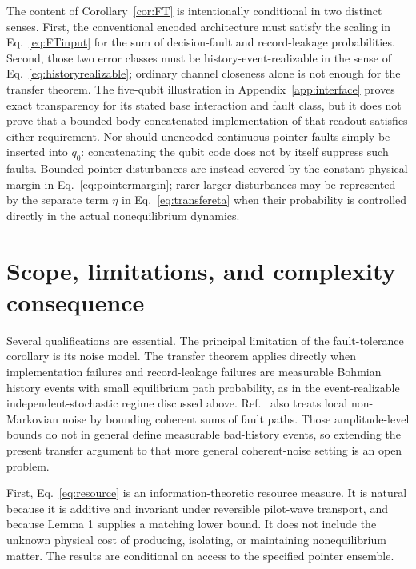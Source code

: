 \documentclass[pdflatex,sn-mathphys-num]{sn-jnl}
\theoremstyle{thmstyleone}
\begin{document}
The content of Corollary~\ref{cor:FT} is intentionally conditional in two distinct senses. First, the conventional encoded architecture must satisfy the scaling in Eq.~\eqref{eq:FTinput} for the sum of decision-fault and record-leakage probabilities. Second, those two error classes must be history-event-realizable in the sense of Eq.~\eqref{eq:historyrealizable}; ordinary channel closeness alone is not enough for the transfer theorem. The five-qubit illustration in Appendix~\ref{app:interface} proves exact transparency for its stated base interaction and fault class, but it does not prove that a bounded-body concatenated implementation of that readout satisfies either requirement. Nor should unencoded continuous-pointer faults simply be inserted into $q_0$: concatenating the qubit code does not by itself suppress such faults. Bounded pointer disturbances are instead covered by the constant physical margin in Eq.~\eqref{eq:pointermargin}; rarer larger disturbances may be represented by the separate term $\eta$ in Eq.~\eqref{eq:transfereta} when their probability is controlled directly in the actual nonequilibrium dynamics.

\section{Scope, limitations, and complexity consequence}

Several qualifications are essential. The principal limitation of the fault-tolerance corollary is its noise model. The transfer theorem applies directly when implementation failures and record-leakage failures are measurable Bohmian history events with small equilibrium path probability, as in the event-realizable independent-stochastic regime discussed above. Ref.~\cite{AliferisGottesmanPreskill2006} also treats local non-Markovian noise by bounding coherent sums of fault paths. Those amplitude-level bounds do not in general define measurable bad-history events, so extending the present transfer argument to that more general coherent-noise setting is an open problem.

First, Eq.~\eqref{eq:resource} is an information-theoretic resource measure. It is natural because it is additive and invariant under reversible pilot-wave transport, and because Lemma 1 supplies a matching lower bound. It does not include the unknown physical cost of producing, isolating, or maintaining nonequilibrium matter. The results are conditional on access to the specified pointer ensemble.
\end{document}
